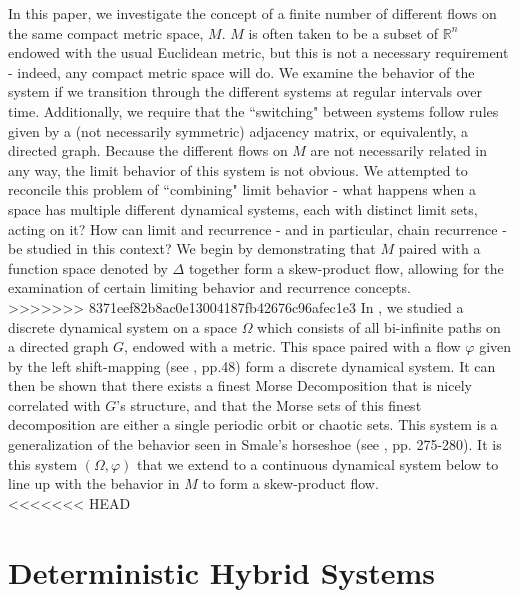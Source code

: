 \documentclass[11pt]{article}
\begin{document}
\indent In this paper, we investigate the concept of a finite number of different flows on the same compact metric space, $M$.  $M$ is often taken to be a subset of $\mathbb{R}^n$ endowed with the usual Euclidean metric, but this is not a necessary requirement - indeed, any compact metric space will do.  We examine the behavior of the system if we transition through the different systems at regular intervals over time.  Additionally, we require that the ``switching" between systems follow rules given by a (not necessarily symmetric) adjacency matrix, or equivalently, a directed graph.  Because the different flows on $M$ are not necessarily related in any way, the limit behavior of this system is not obvious.  We attempted to reconcile this problem of ``combining" limit behavior - what happens when a space has multiple different dynamical systems, each with distinct limit sets, acting on it?  How can limit and recurrence - and in particular, chain recurrence - be studied in this context? We begin by demonstrating that $M$ paired with a function space denoted by $\Delta$ together form a skew-product flow, allowing for the examination of certain limiting behavior and recurrence concepts. \\
>>>>>>> 8371eef82b8ac0e13004187fb42676c96afec1e3
\indent In \cite{discretesystems}, we studied a discrete dynamical system on a space $\Omega$ which consists of all bi-infinite paths on a directed graph $G$, endowed with a metric.   This space paired with a flow $\varphi$ given by the left shift-mapping (see \cite{Katok}, pp.48) form a discrete dynamical system.  It can then be shown that there exists a finest Morse Decomposition that is nicely correlated with $G$'s structure, and that the Morse sets of this finest decomposition are either a single periodic orbit or chaotic sets.  This system is a generalization of the behavior seen in Smale's horseshoe (see 
\cite{Robinson}, pp. 275-280).  It is this system $(\Omega, \varphi)$ that we extend to a continuous dynamical system below to line up with the behavior in $M$ to form a skew-product flow.\\


<<<<<<< HEAD
\section{Deterministic Hybrid Systems}\label{DHS}
\end{document}
